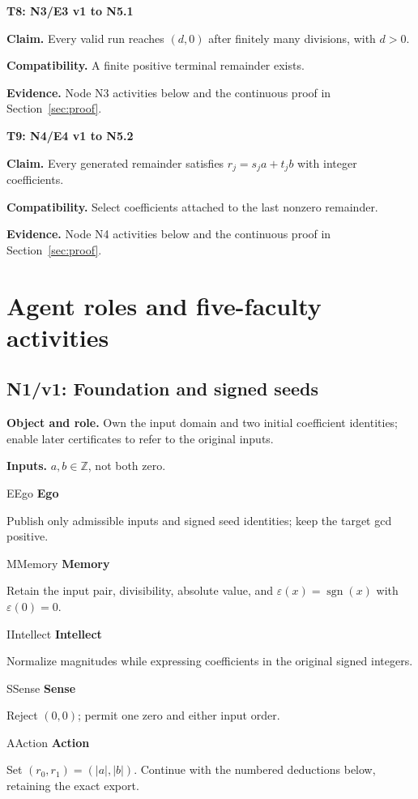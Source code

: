 \documentclass[preprint,12pt,aps,pra,showkeys,amsmath,amssymb,superscriptaddress,floatfix]{revtex4-2}
\theoremstyle{definition}
\theoremstyle{remark}
\newcommand{\mmfaculty}[3]{%
 \begin{mmfacultybox}{#1}{#2}
 {\sffamily\bfseries\color{MMBlue}#2}\par\smallskip #3
 \end{mmfacultybox}}
\newcommand{\field}[2]{\par\smallskip\noindent\textbf{#1.} #2\par}
\begin{document}
\smallskip\noindent\textbf{T8: N3/E3 v1 to N5.1}

\field{Claim}{Every valid run reaches \((d,0)\) after finitely many divisions, with
\(d>0\).}

\field{Compatibility}{A finite positive terminal remainder exists.}

\field{Evidence}{Node N3 activities below and the continuous proof in Section~\ref{sec:proof}.}

\smallskip\noindent\textbf{T9: N4/E4 v1 to N5.2}

\field{Claim}{Every generated remainder satisfies \(r_j=s_ja+t_jb\) with integer
coefficients.}

\field{Compatibility}{Select coefficients attached to the last nonzero remainder.}

\field{Evidence}{Node N4 activities below and the continuous proof in Section~\ref{sec:proof}.}

\endgroup

\clearpage\section{Agent roles and five-faculty activities}

\subsection{N1/v1: Foundation and signed seeds}

\field{Object and role}{Own the input domain and two initial coefficient identities; enable
later certificates to refer to the original inputs.}

\field{Inputs}{\(a,b\in\mathbb Z\), not both zero.}

\mmfaculty{E}{Ego}{Publish only admissible inputs and signed seed identities; keep the
target gcd positive.}

\mmfaculty{M}{Memory}{Retain the input pair, divisibility, absolute value, and
\(\varepsilon(x)=\operatorname{sgn}(x)\) with \(\varepsilon(0)=0\).}

\mmfaculty{I}{Intellect}{Normalize magnitudes while expressing coefficients in the original
signed integers.}

\mmfaculty{S}{Sense}{Reject \((0,0)\); permit one zero and either input order.}

\mmfaculty{A}{Action}{Set \((r_0,r_1)=(|a|,|b|)\). Continue with the numbered deductions
below, retaining the exact export.}
\end{document}
